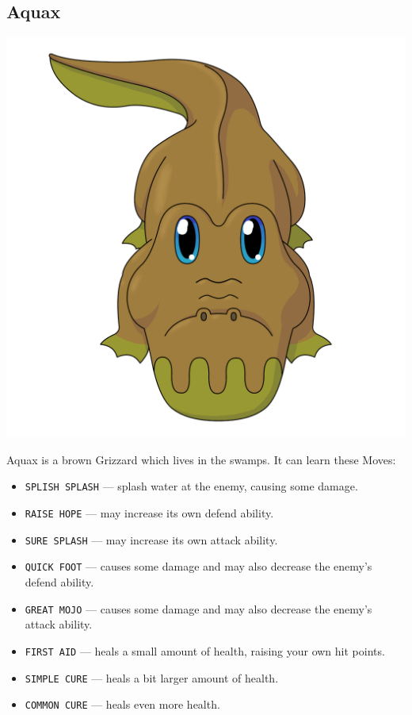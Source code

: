\documentclass[10pt,twocolumn,openany,article]{memoir}
\begin{document}
\begin{description}
\fi

\section{Aquax}

\includegraphics[width=\columnwidth]{../Manual/Aquax.png}

Aquax is a brown Grizzard which lives  in the swamps. It can learn these
Moves:

\begin{itemize}
\item  \texttt{SPLISH SPLASH}  --- splash  water at  the enemy,  causing
  some damage. 
\item \texttt{RAISE HOPE} --- may increase its own defend ability.
\item \texttt{SURE SPLASH} --- may increase its own attack ability.
\item \texttt{QUICK FOOT}  --- causes some damage and  may also decrease
  the enemy's defend ability.
\item \texttt{GREAT MOJO}  --- causes some damage and  may also decrease
  the enemy's attack ability.
\item \texttt{FIRST  AID} ---  heals a small  amount of  health, raising
  your own hit points.
\item \texttt{SIMPLE CURE} --- heals a bit larger amount of health.
\item \texttt{COMMON CURE} --- heals even more health.
\end{itemize}


\end{description}
\end{document}
